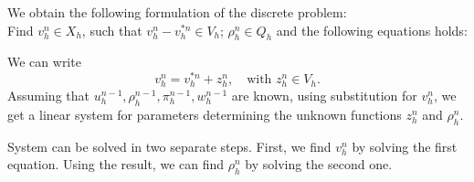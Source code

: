 We obtain the following formulation of the discrete problem:\\
Find $v_h^n \in X_h$, such that $v_h^n - v_h^{*n} \in V_h$; $\rho_h^n \in Q_h$ and
the following equations holds:


We can write 
$$v_h^n=v_h^{*n}+z_h^n, \quad \mbox{with } z_h^n \in V_h.$$
Assuming that $u_h^{n-1},\rho_h^{n-1},\pi_h^{n-1},w_h^{n-1}$ are known, using
substitution for $v_h^n$, we get a linear system for parameters determining
the unknown functions $z_h^n$ and $\rho_h^n$.

System  can be solved in two separate steps. First, we
find $v_h^n$ by solving the first equation. Using the result, we can find
$\rho_h^n$ by solving the second one.
